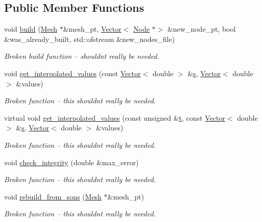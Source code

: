 \subsection*{Public Member Functions}
\begin{DoxyCompactItemize}
\item 
void \hyperlink{classoomph_1_1NonRefineableElementWithHangingNodes_af1eacf195e0bde91008b4bf4a4854a66}{build} (\hyperlink{classoomph_1_1Mesh}{Mesh} $\ast$\&mesh\+\_\+pt, \hyperlink{classoomph_1_1Vector}{Vector}$<$ \hyperlink{classoomph_1_1Node}{Node} $\ast$$>$ \&new\+\_\+node\+\_\+pt, bool \&was\+\_\+already\+\_\+built, std\+::ofstream \&new\+\_\+nodes\+\_\+file)
\begin{DoxyCompactList}\small\item\em Broken build function -- shouldn\textquotesingle{}t really be needed. \end{DoxyCompactList}\item 
void \hyperlink{classoomph_1_1NonRefineableElementWithHangingNodes_a0e25496a8ffacdef5fb93a934874b7ef}{get\+\_\+interpolated\+\_\+values} (const \hyperlink{classoomph_1_1Vector}{Vector}$<$ double $>$ \&\hyperlink{cfortran_8h_ab7123126e4885ef647dd9c6e3807a21c}{s}, \hyperlink{classoomph_1_1Vector}{Vector}$<$ double $>$ \&values)
\begin{DoxyCompactList}\small\item\em Broken function -- this shouldn\textquotesingle{}t really be needed. \end{DoxyCompactList}\item 
virtual void \hyperlink{classoomph_1_1NonRefineableElementWithHangingNodes_a864c5d93b38c49401561db85bb545e27}{get\+\_\+interpolated\+\_\+values} (const unsigned \&\hyperlink{cfortran_8h_af6f0bd3dc13317f895c91323c25c2b8f}{t}, const \hyperlink{classoomph_1_1Vector}{Vector}$<$ double $>$ \&\hyperlink{cfortran_8h_ab7123126e4885ef647dd9c6e3807a21c}{s}, \hyperlink{classoomph_1_1Vector}{Vector}$<$ double $>$ \&values)
\begin{DoxyCompactList}\small\item\em Broken function -- this shouldn\textquotesingle{}t really be needed. \end{DoxyCompactList}\item 
void \hyperlink{classoomph_1_1NonRefineableElementWithHangingNodes_a68766070804623a8575bc4be86325fa3}{check\+\_\+integrity} (double \&max\+\_\+error)
\begin{DoxyCompactList}\small\item\em Broken function -- this shouldn\textquotesingle{}t really be needed. \end{DoxyCompactList}\item 
void \hyperlink{classoomph_1_1NonRefineableElementWithHangingNodes_a702ff8da8744c6fc139c25fa83f4605c}{rebuild\+\_\+from\+\_\+sons} (\hyperlink{classoomph_1_1Mesh}{Mesh} $\ast$\&mesh\+\_\+pt)
\begin{DoxyCompactList}\small\item\em Broken function -- this shouldn\textquotesingle{}t really be needed. \end{DoxyCompactList}\end{DoxyCompactItemize}
